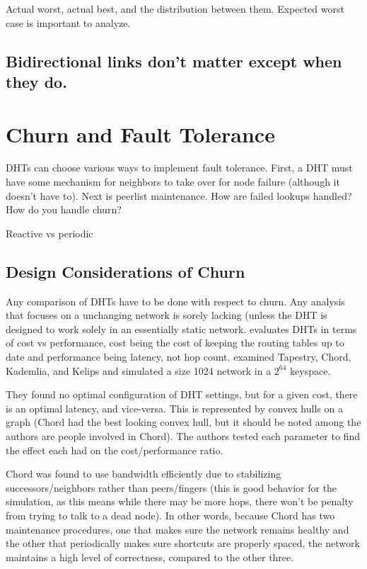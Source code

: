 \documentclass[10pt,letterpaper]{report}
\begin{document}
Actual worst, actual best, and the distribution between them.  Expected worst case is important to analyze.

\subsection{Bidirectional links don't matter except when they do.}

\section{Churn and Fault Tolerance}  %

DHTs can choose various ways to implement fault tolerance.  First, a DHT must have some mechanism for neighbors to take over for node failure (although it doesn't have to).  Next is peerlist maintenance.  How are failed lookups handled?  How do you handle churn?


Reactive vs periodic


\subsection{Design Considerations of Churn}

Any comparison of DHTs have to be done with respect to churn.    Any analysis  that focuses on a unchanging network is sorely lacking (unless the DHT is designed to work solely in an essentially static network. \cite{lichurn}  evaluates DHTs in terms of cost vs performance, cost being the cost of keeping the routing tables up to date and performance being latency, not hop count.  \cite{lichurn} examined Tapestry, Chord, Kademlia, and Kelips and simulated a size 1024 network in a $2^64$ keyspace.   

They found no optimal configuration of DHT settings, but for a given cost, there is an optimal latency, and vice-versa.  This is represented by convex hulls on a graph (Chord had the best looking convex hull, but it should be noted among the authors are people involved in Chord).   The authors tested each parameter to find the effect each had on the cost/performance ratio.

Chord was found to use bandwidth efficiently due to stabilizing successors/neighbors rather than peers/fingers  (this is good behavior for the simulation, as this means while there may be more hops, there won't be penalty from trying to talk to a dead node).  In other words, because Chord has two maintenance procedures, one that makes sure the network remains healthy and the other that periodically makes sure shortcuts are properly spaced, the network maintains a high level of correctness, compared to the other three.
\end{document}
